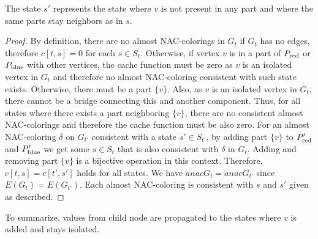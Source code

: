\newpage
{}
%
The state \( s' \) represents the state where \( v \) is not present in any part
and where the same parts stay neighbors as in \( s \).
%
\begin{proof}
	By definition, there are no almost NAC-colorings
	in \( G_t \) if \( G_t \) has no edges,
	therefore \( c[t, s] = 0 \) for each \( s \in S_t \).
	Otherwise, if vertex \( v \) is in a part of \( P_{\text{red}} \) or \( P_{\text{blue}} \) with other vertices,
	the cache function must be zero as \( v \) is an isolated vertex in \( G_t \)
	and therefore no almost NAC-coloring consistent with such state exists.
	Otherwise, there must be a part \( \{v\} \).
	Also, as \( v \) is an isolated vertex in \( G_t \), there cannot be a bridge
	connecting this and another component.
	Thus, for all states where there exists
	a part neighboring \( \{v\} \), there are no consistent almost NAC-colorings
	and therefore the cache function must be also zero.
	For an almost NAC-coloring \( \delta \) on \( G_{t'} \) consistent with
	a state \( s' \in S_{t'} \),
	by adding part \( \{v\} \) to \( P_{\text{red}}' \) and \( P_{\text{blue}}' \)
	we get some \( s \in S_t \) that is also consistent with \( \delta \) in \( G_t \).
	Adding and removing part \( \{v\} \) is a bijective operation in this context.
	Therefore, \( c[t, s] = c[t', s'] \) holds for all states.
	We have \( anac{G_t} = anac{G_{t'}} \) since \( E(G_t) = E(G_{t'}) \).
	Each almost NAC-coloring is consistent
	with \( s \) and \( s' \) given as described.
\end{proof}
%
To summarize, values from child node are propagated to the states
where \( v \) is added and stays isolated.

